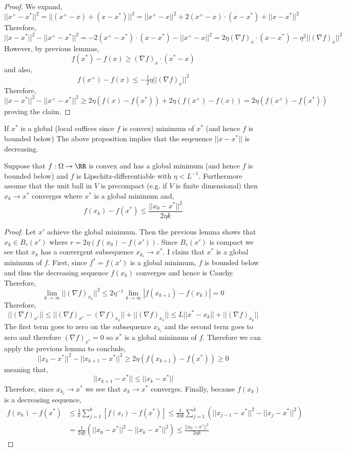 \documentclass[12pt]{article}
\begin{document}
\begin{proof}
We expand,
\[ || x^+ - x^* ||^2 = || (x^+ - x) + (x - x^*) ||^2 = || x^+ - x ||^2  + 2 (x^+ - x) \cdot (x - x^*) + || x - x^* ||^2 \]
Therefore,  
\[ || x - x^* ||^2 - || x^+ - x^* ||^2 = - 2 (x^+ - x^*) \cdot (x - x^*) - || x^+ - x ||^2 = 2 \eta (\nabla f)_x \cdot (x - x^*) - \eta^2 || (\nabla f)_x ||^2  \]
However, by previous lemmas,
\[ f(x^*) - f(x) \ge (\nabla f)_x \cdot (x^* - x) \]
and also,
\[ f(x^+) - f(x) \le - \tfrac{1}{2} \eta || (\nabla f)_x ||^2 \]
Therefore,
\[ || x - x^* ||^2 - || x^+ - x^* ||^2 \ge 2 \eta (f(x) - f(x^*)) + 2 \eta (f(x^+) - f(x)) = 2 \eta (f(x^+) - f(x^*)) \]  
proving the claim.
\end{proof}

\begin{rmk}
If $x^*$ is a global (local suffices since $f$ is convex) minimum of $x^*$ (and hence $f$ is bounded below) The above proposition implies that the seqeuence $||x - x^*||$ is decreasing.
\end{rmk}

\begin{prop}
Suppose that $f : \Omega \to \RR$ is convex and has a global minimum (and hence $f$ is bounded below) and $f$ is Lipschitz-differentiable with $\eta < L^{-1}$. Furthermore assume that the unit ball in $V$ is precompact (e.g. if $V$ is finite dimensional) then $x_k \to x^*$ converges where $x^*$ is a global minimum and,
\[ f(x_k) - f(x^*) \le \frac{|| x_0 - x^* ||^2}{2 \eta k} \]
\end{prop}

\begin{proof}
Let $x'$ achieve the global minimum. Then the previous lemma shows that $x_k \in B_r(x')$ where $r = 2 \eta (f(x_0) - f(x'))$. Since $\overline{B_r(x')}$ is compact we see that $x_k$ has a convergent subsequence $x_{k_i} \to x^*$. I claim that $x^*$ is a global minimum of $f$. First, since $f^* = f(x')$ is a global minimum, $f$ is bounded below and thus the decreasing sequence $f(x_k)$ converges and hence is Cauchy. Therefore,
\[ \lim_{k \to \infty} || (\nabla f)_{x_k} ||^2 \le 2 \eta^{-1} \lim_{k \to \infty} |f(x_{k+1}) - f(x_k)| = 0 \]
Therefore,
\[ || (\nabla f)_{x^*} || \le || (\nabla f)_{x^*} - (\nabla f)_{x_k} || + || (\nabla f)_{x_k} || \le L || x^* - x_k || + || (\nabla f)_{x_k} ||  \]
The first term goes to zero on the subsequence $x_{k_i}$ and the second term goes to zero and therefore $(\nabla f)_{x^*} = 0$ so $x^*$ is a global minimum of $f$. Therefore we can apply the previous lemma to conclude,
\[ || x_k - x^* ||^2 - || x_{k+1} - x^* ||^2 \ge 2 \eta (f(x_{k+1}) - f(x^*)) \ge 0 \]
meaning that,
\[ || x_{k+1} - x^* || \le || x_k - x^* || \]
Therefore, since $x_{k_i} \to x^*$ we see that $x_k \to x^*$ converges. Finally, because $f(x_k)$ is a decreasing sequence,
\begin{align*}
f(x_k) - f(x^*) & \le \frac{1}{k} \sum_{j = 1}^{k} [f(x_i) - f(x^*)] \le \frac{1}{2 \eta k} \sum_{j = 1}^k \left( || x_{j-1} - x^* ||^2 - || x_{j} - x^* ||^2 \right) 
\\
& = \frac{1}{2 \eta k} \left( || x_0 - x^* ||^2 - || x_k - x^* ||^2 \right) \le \frac{|| x_0 - x^* ||^2}{2 \eta k}
\end{align*}
\end{proof}
\end{document}
